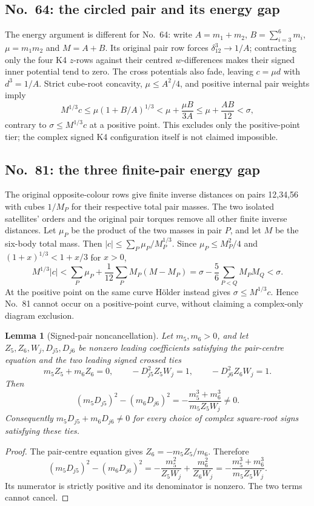 \documentclass[11pt]{amsart}
\newtheorem{lemma}[theorem]{Lemma}
\theoremstyle{remark}
\begin{document}
\subsection{No.~64: the circled pair and its energy gap}\label{sec:no64-energy}
The energy argument is different for No.~64: write $A=m_1+m_2$, $B=\sum_{i=3}^6m_i$, $\mu=m_1m_2$ and $M=A+B$. Its original pair row forces $\delta_{12}^3\to1/A$; contracting only the four K4 $z$-rows against their centred $w$-differences makes their signed inner potential tend to zero. The cross potentials also fade, leaving $c=\mu d$ with $d^3=1/A$. Strict cube-root concavity, $\mu\le A^2/4$, and positive internal pair weights imply
\begin{equation}\label{eq:no64-holder-gap}
M^{1/3}c\le\mu(1+B/A)^{1/3}<\mu+\frac{\mu B}{3A}\le\mu+\frac{AB}{12}<\sigma,
\end{equation}
contrary to $\sigma\le M^{1/3}c$ at a positive point. This excludes only the positive-point tier; the complex signed K4 configuration itself is not claimed impossible.

\subsection{No.~81: the three finite-pair energy gap}\label{sec:no81-energy}
The original opposite-colour rows give finite inverse distances on pairs 12,34,56 with cubes $1/M_P$ for their respective total pair masses. The two isolated satellites' orders and the original pair torques remove all other finite inverse distances. Let $\mu_P$ be the product of the two masses in pair $P$, and let $M$ be the six-body total mass. Then $|c|\le\sum_P\mu_P/M_P^{1/3}$. Since $\mu_P\le M_P^2/4$ and $(1+x)^{1/3}<1+x/3$ for $x>0$,
\begin{equation}\label{eq:no81-pair-gap}
M^{1/3}|c|<\sum_P\mu_P+\frac1{12}\sum_P M_P(M-M_P)=\sigma-\frac56\sum_{P<Q}M_PM_Q<\sigma.
\end{equation}
At the positive point on the same curve H\"older instead gives $\sigma\le M^{1/3}c$. Hence No.~81 cannot occur on a positive-point curve, without claiming a complex-only diagram exclusion.

\begin{lemma}[Signed-pair noncancellation]\label{lem:excluded-pair-signs}
Let $m_5,m_6>0$, and let $Z_5,Z_6,W_j,D_{j5},D_{j6}$ be nonzero leading coefficients satisfying the pair-centre equation and the two leading signed crossed ties
\[
m_5Z_5+m_6Z_6=0,\qquad
-D_{j5}^2Z_5W_j=1,\qquad
-D_{j6}^2Z_6W_j=1.
\]
Then
\begin{equation}\label{eq:signed-pair-noncancellation}
(m_5D_{j5})^2-(m_6D_{j6})^2=-\frac{m_5^3+m_6^3}{m_5Z_5W_j}\ne0.
\end{equation}
Consequently $m_5D_{j5}+m_6D_{j6}\ne0$ for every choice of complex square-root signs satisfying these ties.
\end{lemma}
\begin{proof}
The pair-centre equation gives $Z_6=-m_5Z_5/m_6$. Therefore
\[
(m_5D_{j5})^2-(m_6D_{j6})^2
=-\frac{m_5^2}{Z_5W_j}+\frac{m_6^2}{Z_6W_j}
=-\frac{m_5^3+m_6^3}{m_5Z_5W_j}.
\]
Its numerator is strictly positive and its denominator is nonzero. The two terms cannot cancel.
\end{proof}
\end{document}
